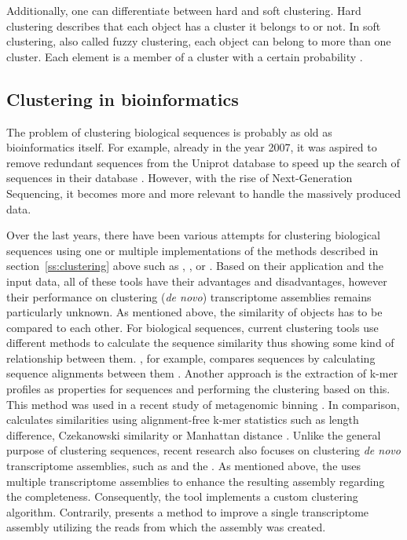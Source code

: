 \documentclass[12pt,a4paper,english]{article}
\begin{document}
    Additionally, one can differentiate between hard and soft clustering. Hard clustering describes that each object has a cluster it belongs to or not. In soft clustering, also called fuzzy clustering, each object can belong to more than one cluster. Each element is a member of a cluster with a certain probability \citep{hard-vs-soft:14}.


	\subsection{Clustering in bioinformatics}
	The problem of clustering biological sequences is probably as old as bioinformatics itself. For example, already in the year 2007, it was aspired to remove redundant sequences from the Uniprot database to speed up the search of sequences in their database \citep{uniref:07}. However, with the rise of Next-Generation Sequencing, it becomes more and more relevant to handle the massively produced data.
	
	Over the last years, there have been various attempts for clustering biological sequences using one or multiple implementations of the methods described in section~\ref{ss:clustering} above such as \cdhit \citep{cd-hit:06, cd-hit:12}, \uclust \citep{uclust:10}, \linclust \citep{linclust:18} or \mclust \citep{meshclust:18}. Based on their application and the input data, all of these tools have their advantages and disadvantages, however their performance on clustering (\textit{de novo}) transcriptome assemblies remains particularly unknown.
	As mentioned above, the similarity of objects has to be compared to each other. For biological sequences, current clustering tools use different methods to calculate the sequence similarity thus showing some kind of relationship between them.
	\cdhit, for example, compares sequences by calculating sequence alignments between them \citep{cd-hit:12}.
	Another approach is the extraction of k-mer profiles as properties for sequences and performing the clustering based on this. This method was used in a recent study of metagenomic binning \citep{binning:16}.
	In comparison, \mclust calculates similarities using alignment-free k-mer statistics such as length difference, Czekanowski similarity or Manhattan distance \citep{meshclust:18}.
	Unlike the general purpose of clustering sequences, recent research also focuses on clustering \textit{de novo} transcriptome assemblies, such as \grouper \citep{Grouper:18} and the \orp.
	As mentioned above, the \orp uses multiple transcriptome assemblies to enhance the resulting assembly regarding the completeness. Consequently, the tool implements a custom clustering algorithm.
	Contrarily, \grouper presents a method to improve a single transcriptome assembly utilizing the reads from which the assembly was created.
	
\end{document}
